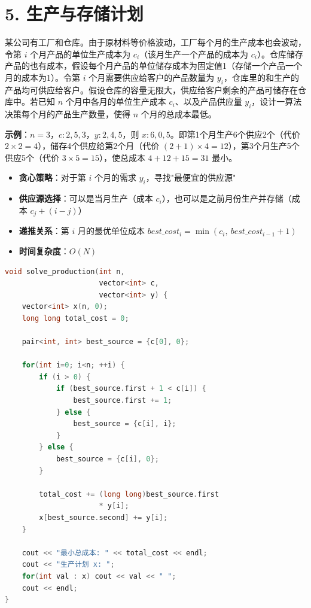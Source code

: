 \section*{5. 生产与存储计划}

某公司有工厂和仓库。由于原材料等价格波动，工厂每个月的生产成本也会波动，令第 $i$ 个月产品的单位生产成本为 $c_i$（该月生产一个产品的成本为 $c_i$）。仓库储存产品的也有成本，假设每个月产品的单位储存成本为固定值1（存储一个产品一个月的成本为1）。令第 $i$ 个月需要供应给客户的产品数量为 $y_i$，仓库里的和生产的产品均可供应给客户。假设仓库的容量无限大，供应给客户剩余的产品可储存在仓库中。若已知 $n$ 个月中各月的单位生产成本 $c_i$、以及产品供应量 $y_i$，设计一算法决策每个月的产品生产数量，使得 $n$ 个月的总成本最低。

\textbf{示例}：$n=3$，$c: 2,5,3$，$y: 2,4,5$，则 $x: 6,0,5$。即第1个月生产6个供应2个（代价 $2 \times 2=4$），储存4个供应给第2个月（代价 $(2+1) \times 4=12$），第3个月生产5个供应5个（代价 $3 \times 5=15$），使总成本 $4+12+15=31$ 最小。

\begin{itemize}
    \item \textbf{贪心策略}：对于第 $i$ 个月的需求 $y_i$，寻找"最便宜的供应源"
    \item \textbf{供应源选择}：可以是当月生产（成本 $c_i$），也可以是之前月份生产并存储（成本 $c_{j} + (i-j)$）
    \item \textbf{递推关系}：第 $i$ 月的最优单位成本 $best\_cost_i = \min(c_i, \ best\_cost_{i-1} + 1)$
    \item \textbf{时间复杂度}：$O(N)$
\end{itemize}

\begin{lstlisting}[language=C++, style=cppstyle]
void solve_production(int n,
                      vector<int> c,
                      vector<int> y) {
    vector<int> x(n, 0);
    long long total_cost = 0;

    pair<int, int> best_source = {c[0], 0};

    for(int i=0; i<n; ++i) {
        if (i > 0) {
            if (best_source.first + 1 < c[i]) {
                best_source.first += 1;
            } else {
                best_source = {c[i], i};
            }
        } else {
            best_source = {c[i], 0};
        }

        total_cost += (long long)best_source.first
                      * y[i];
        x[best_source.second] += y[i];
    }

    cout << "最小总成本: " << total_cost << endl;
    cout << "生产计划 x: ";
    for(int val : x) cout << val << " ";
    cout << endl;
}
\end{lstlisting}

